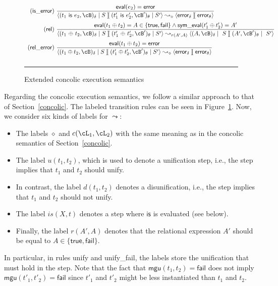 \documentclass[fleqn]{tlp}
\newcommand{\true}{\mathsf{true}}
\newcommand{\mgu}{\mathsf{mgu}}
\newcommand{\error}{\mathsf{error}}
\newcommand{\fail}{\mathsf{fail}}
\newcommand{\sep}{\mathit{\;]\![\;}}
\def \tuple#1{\langle #1 \rangle}
\begin{document}
\begin{appendix}
\begin{figure}[b]
\[\begin{array}{r@{~}l}
    \mathsf{(is\_error)} & {\displaystyle 
      \frac{\mathsf{eval}(e_2) = \mathsf{error}} 
        {\tuple{(t_1~\mathsf{is}~e_2,\cB)_\delta\mid S
          \sep (t'_1~\mathsf{is}~e'_2,\cB')_\theta\mid S'}
          \leadsto_\diamond
          \tuple{\error_\delta\sep \error_\theta}}
        } \\[3ex]

    \mathsf{(rel)} & {\displaystyle 
      \frac{\mathsf{eval}(t_1\oplus t_2) = A \in\{\mathsf{true},\mathsf{fail}\}
      \wedge \mathsf{sym\_eval}(t'_1\oplus t'_2) = A'} 
      {\tuple{(t_1~{\oplus}~t_2,\cB)_\delta\mid S\sep
          (t'_1~{\oplus}~t'_2,\cB')_\theta\mid S'}
          \leadsto_{r(A',A)}
          \tuple{(A,\cB)_\delta\mid ~ S\sep (A',\cB')_\theta\mid ~ S'}}
        } \\[3ex]

    \mathsf{(rel\_error)} & {\displaystyle 
      \frac{\mathsf{eval}(t_1\oplus t_2) = \mathsf{error}} 
        {\tuple{(t_1\oplus t_2,\cB)_\delta\mid S\sep (t'_1\oplus t'_2,\cB')_\theta\mid S'}
          \leadsto_\diamond
          \tuple{\error_\delta\sep \error_\theta}}
        } \\[3ex]

    \end{array}
    \]
  \rule{\linewidth}{1pt}
  \caption{Extended concolic execution semantics} \label{fig:concolic3}
\end{figure}

\noindent
Regarding the concolic execution semantics, we follow a similar
approach to that of Section~\ref{concolic}. The labeled transition
rules can be seen in Figure~\ref{fig:concolic3}. Now, we consider six
kinds of labels for $\leadsto$:
\begin{itemize}
\item The labels $\diamond$ and $c(\cL_1,\cL_2)$ with the same meaning
  as in the concolic semantics of Section~\ref{concolic}.

\item The label $u(t_1,t_2)$, which is used to denote a unification
  step, i.e., the step implies that $t_1$ and $t_2$ should unify.

\item In contrast, the label $d(t_1,t_2)$ denotes a disunification,
  i.e., the step implies that $t_1$ and $t_2$ should not unify.

\item The label $is(X,t)$ denotes a step where $\mathsf{is}$ is
  evaluated (see below). 

\item Finally, the label $r(A',A)$ denotes that the relational
  expression $A'$ should be equal to $A\in\{\true,\fail\}$.
\end{itemize}
In particular, in rules \textsf{unify} and \textsf{unify\_fail}, the
labels store the unification that must hold in the step. Note that the
fact that $\mgu(t_1,t_2)=\fail$ does not imply $\mgu(t'_1,t'_2)=\fail$
since $t'_1$ and $t'_2$ might be less instantiated than $t_1$ and
$t_2$.


\end{appendix}
\end{document}
